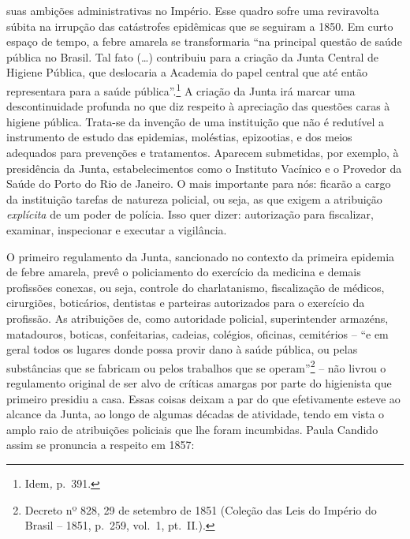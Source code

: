 suas ambições administrativas no Império. Esse quadro sofre uma
reviravolta súbita na irrupção das catástrofes epidêmicas que se
seguiram a 1850. Em curto espaço de tempo, a febre amarela se
transformaria ``na principal questão de saúde pública no Brasil. Tal
fato (\ldots{}) contribuiu para a criação da Junta Central de Higiene
Pública, que deslocaria a Academia do papel central que até então
representara para a saúde pública''.\footnote{Idem\emph{,} p.~391.} A
criação da Junta irá marcar uma descontinuidade profunda no que diz
respeito à apreciação das questões caras à higiene pública. Trata-se da
invenção de uma instituição que não é redutível a instrumento de estudo
das epidemias, moléstias, epizootias, e dos meios adequados para
prevenções e tratamentos. Aparecem submetidas, por exemplo, à
presidência da Junta, estabelecimentos como o Instituto Vacínico e o
Provedor da Saúde do Porto do Rio de Janeiro. O mais importante para
nós: ficarão a cargo da instituição tarefas de natureza policial, ou
seja, as que exigem a atribuição \emph{explícita} de um poder de
polícia. Isso quer dizer: autorização para fiscalizar, examinar,
inspecionar e executar a vigilância.

O primeiro regulamento da Junta, sancionado no contexto da primeira
epidemia de febre amarela, prevê o policiamento do exercício da medicina
e demais profissões conexas, ou seja, controle do charlatanismo,
fiscalização de médicos, cirurgiões, boticários, dentistas e parteiras
autorizados para o exercício da profissão. As atribuições de, como
autoridade policial, superintender armazéns, matadouros, boticas,
confeitarias, cadeias, colégios, oficinas, cemitérios -- ``e em geral
todos os lugares donde possa provir dano à saúde pública, ou pelas
substâncias que se fabricam ou pelos trabalhos que se operam''\footnote{Decreto
  nº 828, 29 de setembro de 1851 (Coleção das Leis do Império do Brasil
  -- 1851, p.~259, vol.~1, pt.~II.).} -- não livrou o regulamento
original de ser alvo de críticas amargas por parte do higienista que
primeiro presidiu a casa. Essas coisas deixam a par do que efetivamente
esteve ao alcance da Junta, ao longo de algumas décadas de atividade,
tendo em vista o amplo raio de atribuições policiais que lhe foram
incumbidas. Paula Candido assim se pronuncia a respeito em 1857:

